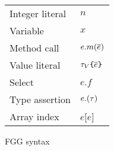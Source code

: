 \documentclass[acmsmall,screen]{acmart}
\begin{document}
\begin{figure}
{\begin{minipage}[t]{0.4\textwidth}
\begin{tabular}[t]{ll}
                \quad Integer literal             & \quad$n$                                                 \\
                \quad Variable                    & \quad $x$                                                \\
                \quad Method call                 & \quad $e.m(\overline{e})$                                      \\
                \quad Value literal               & \quad ${\color{black}\tau_V}\texttt{\{}\overline{e}\texttt{\}}$                        \\
                \quad Select                      & \quad $e.f$                                              \\
                \quad Type assertion              & \quad $e.({\color{black}\tau})$                                 \\
                \quad Array index                 & \quad$e$[$e$]
            \end{tabular}
        \end{minipage}
    }
    \caption{FGG syntax}
    \vspace{3ex}
\end{figure}
\end{document}
